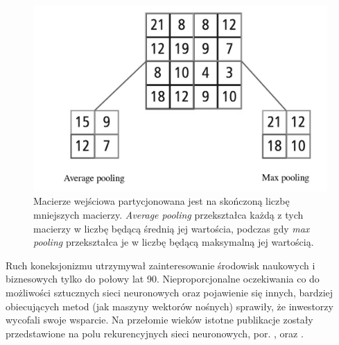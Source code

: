 \documentclass[12pt,a4paper,twoside]{article}
\begin{document}
\begin{figure}[h]
  \centering
\includegraphics[scale=0.2]{../obrazy/fig:pooling.png}
\caption{Macierze wejściowa partycjonowana jest na skończoną liczbę mniejszych macierzy. \textit{Average pooling} przekształca każdą z tych macierzy w liczbę będącą średnią jej wartościa, podczas gdy \textit{max pooling} przekształca je w liczbę będącą maksymalną jej wartością. \label{fig:pooling}}
\end{figure}

Ruch koneksjonizmu utrzymywał zainteresowanie środowisk naukowych i biznesowych tylko do połowy lat 90. Nieproporcjonalne oczekiwania co do możliwości sztucznych sieci neuronowych oraz pojawienie się innych, bardziej obiecujących metod (jak maszyny wektorów nośnych) sprawiły, że inwestorzy wycofali swoje wsparcie. Na przełomie wieków istotne publikacje zostały przedstawione na polu rekurencyjnych sieci neuronowych, por. \citet{hochreiter1997}, \citet{schuster1997} oraz \citet{graves2003}.
\end{document}
